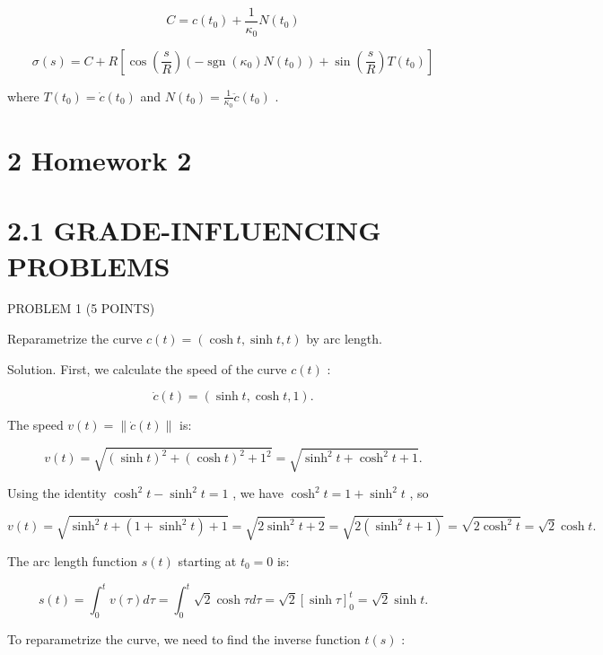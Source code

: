 \documentclass[10pt]{article}
\begin{document}
\[
C = c\left( {t}_{0}\right)  + \frac{1}{{\kappa }_{0}}N\left( {t}_{0}\right)
\]

\[
\sigma \left( s\right)  = C + R\left\lbrack  {\cos \left( \frac{s}{R}\right) \left( {-\operatorname{sgn}\left( {\kappa }_{0}\right) N\left( {t}_{0}\right) }\right)  + \sin \left( \frac{s}{R}\right) T\left( {t}_{0}\right) }\right\rbrack
\]

where \(T\left( {t}_{0}\right)  = \dot{c}\left( {t}_{0}\right)\) and \(N\left( {t}_{0}\right)  = \frac{1}{{\kappa }_{0}}\ddot{c}\left( {t}_{0}\right)\) .

\section*{2 Homework 2}

\section*{2.1 GRADE-INFLUENCING PROBLEMS}

PROBLEM 1 (5 POINTS)

Reparametrize the curve \(c\left( t\right)  = \left( {\cosh t,\sinh t,t}\right)\) by arc length.

Solution. First, we calculate the speed of the curve \(c\left( t\right)\) :

\[
\dot{c}\left( t\right)  = \left( {\sinh t,\cosh t,1}\right) .
\]

The speed \(v\left( t\right)  = \parallel \dot{c}\left( t\right) \parallel\) is:

\[
v\left( t\right)  = \sqrt{{\left( \sinh t\right) }^{2} + {\left( \cosh t\right) }^{2} + {1}^{2}} = \sqrt{{\sinh }^{2}t + {\cosh }^{2}t + 1}.
\]

Using the identity \({\cosh }^{2}t - {\sinh }^{2}t = 1\) , we have \({\cosh }^{2}t = 1 + {\sinh }^{2}t\) , so

\[
v\left( t\right)  = \sqrt{{\sinh }^{2}t + \left( {1 + {\sinh }^{2}t}\right)  + 1} = \sqrt{2{\sinh }^{2}t + 2} = \sqrt{2\left( {{\sinh }^{2}t + 1}\right) } = \sqrt{2{\cosh }^{2}t} = \sqrt{2}\cosh t.
\]

The arc length function \(s\left( t\right)\) starting at \({t}_{0} = 0\) is:

\[
s\left( t\right)  = {\int }_{0}^{t}v\left( \tau \right) {d\tau } = {\int }_{0}^{t}\sqrt{2}\cosh {\tau d\tau } = \sqrt{2}{\left\lbrack  \sinh \tau \right\rbrack  }_{0}^{t} = \sqrt{2}\sinh t.
\]

To reparametrize the curve, we need to find the inverse function \(t\left( s\right)\) :
\end{document}
